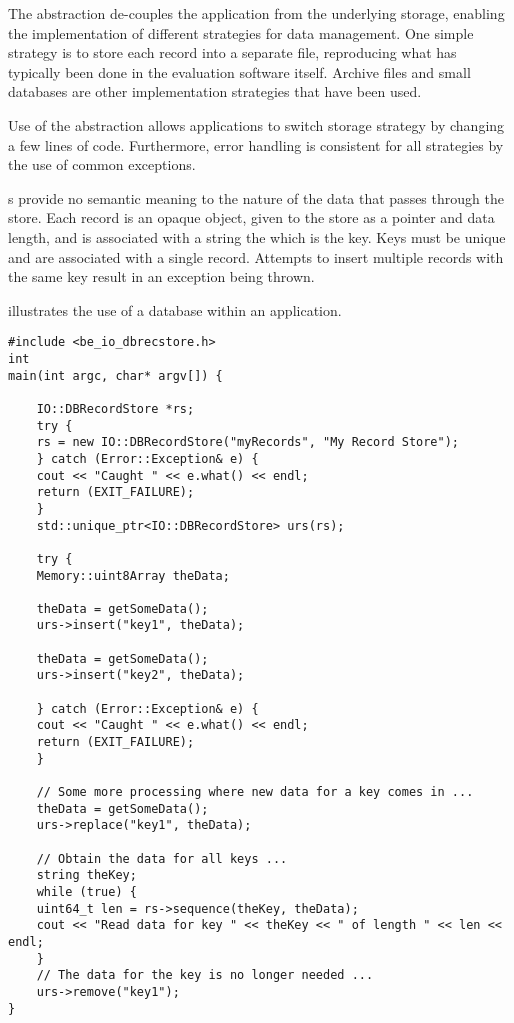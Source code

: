 The  abstraction de-couples the application from
the underlying storage, enabling the implementation of different strategies for
data management. One simple strategy is to store each record into a separate
file, reproducing what has typically been done in the evaluation software
itself. Archive files and small databases are other implementation strategies
that have been used.

Use of the  abstraction allows applications to switch
storage strategy by changing a few lines of code. Furthermore, error handling
is consistent for all strategies by the use of common exceptions.

s provide no semantic meaning to the nature of the data that passes
through the store. Each record is an opaque object, given to the store as a
pointer and data length, and is associated with a string the which is the key.
Keys must
be unique and are associated with a single record. Attempts to insert multiple
records with the same key result in an exception being thrown.

 illustrates the use of a database
 within an application.

\begin{lstlisting}[caption={Using a \class{RecordStore}}, label=lst:recordstoreuse]
#include <be_io_dbrecstore.h>
int
main(int argc, char* argv[]) {

    IO::DBRecordStore *rs;
    try {
	rs = new IO::DBRecordStore("myRecords", "My Record Store");
    } catch (Error::Exception& e) {
	cout << "Caught " << e.what() << endl;
	return (EXIT_FAILURE);
    }
    std::unique_ptr<IO::DBRecordStore> urs(rs);

    try {
	Memory::uint8Array theData;

	theData = getSomeData();
	urs->insert("key1", theData);

	theData = getSomeData();
	urs->insert("key2", theData);

    } catch (Error::Exception& e) {
	cout << "Caught " << e.what() << endl;
	return (EXIT_FAILURE);
    }

    // Some more processing where new data for a key comes in ...
    theData = getSomeData();
    urs->replace("key1", theData);
  
    // Obtain the data for all keys ...
    string theKey;
    while (true) {
	uint64_t len = rs->sequence(theKey, theData);
	cout << "Read data for key " << theKey << " of length " << len << endl;
    }
    // The data for the key is no longer needed ...
    urs->remove("key1");
}
\end{lstlisting}

